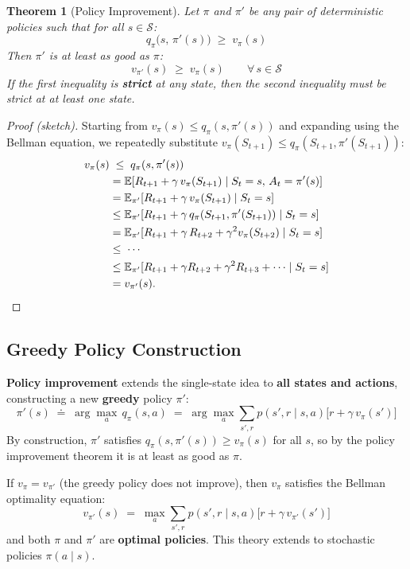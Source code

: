 \documentclass[11pt,a4paper]{article}
\theoremstyle{definition}
\theoremstyle{plain}
\newtheorem{theorem}{Theorem}[section]
\theoremstyle{remark}
\begin{document}
\begin{theorem}[Policy Improvement]
Let $\pi$ and $\pi'$ be any pair of deterministic policies such that for all $s \in \mathcal{S}$:
\[
    q_\pi\bigl(s,\, \pi'(s)\bigr) \;\geq\; v_\pi(s)
\]
Then $\pi'$ is at least as good as $\pi$:
\[
    v_{\pi'}(s) \;\geq\; v_\pi(s) \qquad \forall\, s \in \mathcal{S}
\]
If the first inequality is \textbf{strict} at any state, then the second inequality must be strict at at least one state.
\end{theorem}

\begin{proof}[Proof (sketch)]
Starting from $v_\pi(s) \leq q_\pi(s, \pi'(s))$ and expanding using the Bellman equation, we repeatedly substitute $v_\pi(S_{t+1}) \leq q_\pi(S_{t+1}, \pi'(S_{t+1}))$:
\begin{align*}
    v_\pi(s) &\;\leq\; q_\pi(s, \pi'(s)) \\
    &= \mathbb{E}[R_{t+1} + \gamma\, v_\pi(S_{t+1}) \mid S_t = s,\, A_t = \pi'(s)] \\
    &= \mathbb{E}_{\pi'}[R_{t+1} + \gamma\, v_\pi(S_{t+1}) \mid S_t = s] \\
    &\leq \mathbb{E}_{\pi'}[R_{t+1} + \gamma\, q_\pi(S_{t+1}, \pi'(S_{t+1})) \mid S_t = s] \\
    &= \mathbb{E}_{\pi'}[R_{t+1} + \gamma\, R_{t+2} + \gamma^2 v_\pi(S_{t+2}) \mid S_t = s] \\
    &\leq \;\cdots \\
    &\leq \mathbb{E}_{\pi'}[R_{t+1} + \gamma R_{t+2} + \gamma^2 R_{t+3} + \cdots \mid S_t = s] \\
    &= v_{\pi'}(s). \qedhere
\end{align*}
\end{proof}

\subsection{Greedy Policy Construction}

\textbf{Policy improvement} extends the single-state idea to \textbf{all states and actions}, constructing a new \textbf{greedy} policy $\pi'$:
\[
    \pi'(s) \;\doteq\; \arg\max_a\, q_\pi(s, a)
    \;=\; \arg\max_a \sum_{s', r} p(s', r \mid s, a) \bigl[r + \gamma\, v_\pi(s')\bigr]
\]
By construction, $\pi'$ satisfies $q_\pi(s, \pi'(s)) \geq v_\pi(s)$ for all $s$, so by the policy improvement theorem it is at least as good as $\pi$.

\begin{tcolorbox}[colback=green!5!white, colframe=green!60!black, title={Optimality Condition}]
If $v_\pi = v_{\pi'}$ (the greedy policy does not improve), then $v_\pi$ satisfies the Bellman optimality equation:
\[
    v_{\pi'}(s) \;=\; \max_a \sum_{s', r} p(s', r \mid s, a) \bigl[r + \gamma\, v_{\pi'}(s')\bigr]
\]
and both $\pi$ and $\pi'$ are \textbf{optimal policies}. This theory extends to stochastic policies $\pi(a \mid s)$.
\end{tcolorbox}
\end{document}

